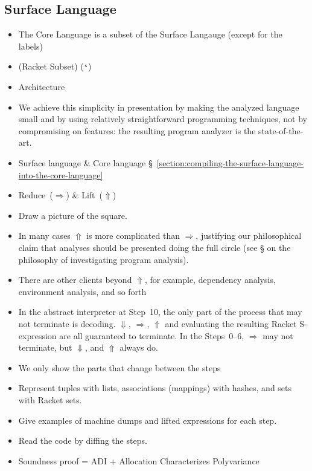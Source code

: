 \documentclass[12pt, oneside]{book}
\begin{document}
\subsection{Surface Language}
\label{section:surface-language}

\begin{itemize}
  \item The Core Language is a subset of the Surface Langauge (except for the labels)
  \item  (Racket Subset) (\texttt{ˢ})
\end{itemize}

\begin{itemize}
  \item Architecture
  \item  We achieve this simplicity in presentation by making the analyzed language small and by using relatively straightforward programming techniques, not by compromising on features: the resulting program analyzer is the state-of-the-art.
  \item Surface language \& Core language §~\ref{section:compiling-the-surface-language-into-the-core-language}
  \item Reduce~(\(⇒\)) \& Lift~(\(⇑\))
  \item Draw a picture of the square.
  \item In many cases \(⇑\) is more complicated than \(⇒\), justifying our philosophical claim that analyses should be presented doing the full circle (see § on the philosophy of investigating program analysis).
  \item There are other clients beyond \(⇑\), for example, dependency analysis, environment analysis, and so forth
  \item In the abstract interpreter at Step~10, the only part of the process that may not terminate is decoding. \(⇓\), \(⇒\), \(⇑\) and evaluating the resulting Racket S-expression are all guaranteed to terminate. In the Steps~0–6, \(⇒\) may not terminate, but \(⇓\), and \(⇑\) always do.
  \item We only show the parts that change between the steps
  \item Represent tuples with lists, associations (mappings) with hashes, and sets with Racket sets.
  \item Give examples of machine dumps and lifted expressions for each step.
  \item Read the code by diffing the steps.
  \item Soundness proof = ADI + Allocation Characterizes Polyvariance
\end{itemize}
\end{document}
